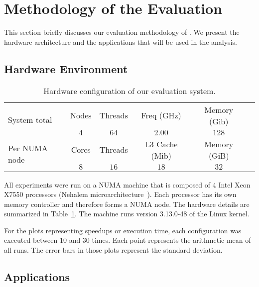 
\section{Methodology of the Evaluation}
\label{sec:metho}

This section briefly discusses our evaluation methodology of \TABARNAC.
We present the hardware architecture and the applications that will be used in the analysis.

\subsection{Hardware Environment}
\label{sec:expe-setup}

\begin{table}[!b]
    \centering
    \caption{Hardware configuration of our evaluation system.}
    \label{tab:turing}
    \footnotesize
        \begin{tabular}{lccccc}
            \toprule
            \multirow{2}{1.5cm}{System total} & Nodes & Threads & Freq (GHz) & Memory (Gib) \\
            \cmidrule(lr){2-5}
                & $4$   & $64$ & $2.00$ & $128$ \\
            \midrule
           \multirow{2}{1.5cm}{\vspace{2mm}Per NUMA node} & Cores & Threads & L3 Cache (Mib) & Memory (GiB) \\
           \cmidrule(lr){2-5}
            & $8$ & $16$ & $18$ & $32$  \\
            \bottomrule
        \end{tabular}

\end{table}

All experiments were run on a NUMA machine that is composed of $4$ Intel Xeon X7550
processors (Nehalem microarchitecture~\cite{Intel2010}). Each processor has its own memory controller and therefore forms a NUMA node. The hardware details are summarized in Table~\ref{tab:turing}.
The machine runs version 3.13.0-48 of the Linux kernel.

For the plots representing speedups or execution time, each configuration was executed between 10 and 30
times. Each point represents the arithmetic mean of all runs.
The error bars in those plots represent the standard deviation.

\subsection{Applications}

